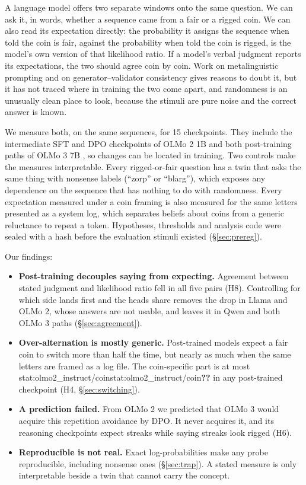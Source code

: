 \documentclass[11pt]{article}
\newcommand{\stat}[1]{\ifcsname stat:#1\endcsname\csname stat:#1\endcsname\else\textbf{??}\fi}
\begin{document}
A language model offers two separate windows onto the same question. We can ask it, in words, whether a sequence came from a fair or a rigged coin. We can also read its expectation directly: the probability it assigns the sequence when told the coin is fair, against the probability when told the coin is rigged, is the model's own version of that likelihood ratio. If a model's verbal judgment reports its expectations, the two should agree coin by coin. Work on metalinguistic prompting \citep{hu2023prompting} and on generator--validator consistency \citep{li2024benchmarking,west2023generative} gives reasons to doubt it, but it has not traced where in training the two come apart, and randomness is an unusually clean place to look, because the stimuli are pure noise and the correct answer is known.

We measure both, on the same sequences, for 15 checkpoints. They include the intermediate SFT and DPO checkpoints of OLMo 2 1B and both post-training paths of OLMo 3 7B \citep{olmo2024olmo2,olmo2025olmo3}, so changes can be located in training. Two controls make the measures interpretable. Every rigged-or-fair question has a twin that asks the same thing with nonsense labels (``zorp'' or ``blarg''), which exposes any dependence on the sequence that has nothing to do with randomness. Every expectation measured under a coin framing is also measured for the same letters presented as a system log, which separates beliefs about coins from a generic reluctance to repeat a token. Hypotheses, thresholds and analysis code were sealed with a hash before the evaluation stimuli existed (\S\ref{sec:prereg}).

Our findings:
\begin{itemize}
  \item \textbf{Post-training decouples saying from expecting.} Agreement between stated judgment and likelihood ratio fell in all five pairs (H8). Controlling for which side lands first and the heads share removes the drop in Llama and OLMo 2, whose answers are not usable, and leaves it in Qwen and both OLMo 3 paths (\S\ref{sec:agreement}).
  \item \textbf{Over-alternation is mostly generic.} Post-trained models expect a fair coin to switch more than half the time, but nearly as much when the same letters are framed as a log file. The coin-specific part is at most \stat{olmo2_instruct/coin} in any post-trained checkpoint (H4, \S\ref{sec:switching}).
  \item \textbf{A prediction failed.} From OLMo 2 we predicted that OLMo 3 would acquire this repetition avoidance by DPO. It never acquires it, and its reasoning checkpoints expect streaks while saying streaks look rigged (H6).
  \item \textbf{Reproducible is not real.} Exact log-probabilities make any probe reproducible, including nonsense ones (\S\ref{sec:trap}). A stated measure is only interpretable beside a twin that cannot carry the concept.
\end{itemize}
\end{document}
